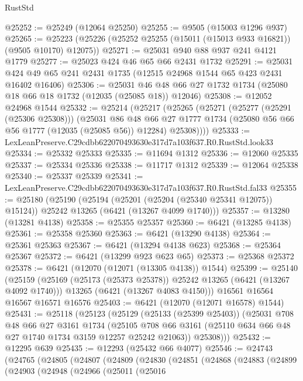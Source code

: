\begin{lexlean}{RustStd}
\begin{coremodule}
@25252 := @25249 (@12064 @25250)
@25255 := @9505 (@15003 @1296 @937)
@25265 := @25223 (@25226 (@25252 @25255 (@15011 (@15013 @933 @16821)) (@9505 @10170) @12075))
@25271 := @25031 @940 @88 @937 @241 @4121 @1779
@25277 := @25023 @424 @46 @65 @66 @2431 @1732
@25291 := @25031 @424 @49 @65 @241 @2431 @1735 (@12515 @24968 @1544 @65 @423 @2431 @16402 @16406)
@25306 := @25031 @46 @48 @66 @27 @1732 @1734 (@25080 @18 @66 @18 @1732 (@12035 (@25085 @18)) @12046)
@25308 := @12052 @24968 @1544
@25332 := @25214
    (@25217
      (@25265
        (@25271
          (@25277 (@25291 (@25306 @25308)))
          (@25031
            @86
            @48
            @66
            @27
            @1777
            @1734
            (@25080 @56 @66 @56 @1777 (@12035 (@25085 @56)) @12284)
            @25308))))
@25333 := LexLeanPreserve.C29cdbb622070493630e317d7a103f637.R0.RustStd.look33
@25334 := @25332 @25333
@25335 := @11694 @1312
@25336 := @12060 @25335
@25337 := @25334 @25336
@25338 := @11717 @1312
@25339 := @12064 @25338
@25340 := @25337 @25339
@25341 := LexLeanPreserve.C29cdbb622070493630e317d7a103f637.R0.RustStd.fal33
@25355 := @25180
    (@25190
      (@25194 (@25201 (@25204 (@25340 @25341 @12075)) @15124))
      @25242
      @13265
      (@6421 (@13267 @4099 @1740)))
@25357 := @13280 (@13281 @4138)
@25358 := @25355 @25357
@25360 := @6421 (@13285 @4138)
@25361 := @25358 @25360
@25363 := @6421 (@13290 @4138)
@25364 := @25361 @25363
@25367 := @6421 (@13294 @4138 @623)
@25368 := @25364 @25367
@25372 := @6421 (@13299 @923 @623 @65)
@25373 := @25368 @25372
@25378 := @6421 (@12070 (@12071 (@13305 @4138)) @1544)
@25399 := @25140
    (@25159
      (@25169 (@25173 (@25373 @25378)) @25242 @13265 (@6421 (@13267 @4092 @1740)))
      @13265
      (@6421 (@13267 @4083 @4150)))
    @16561
    @16564
    @16567
    @16571
    @16576
@25403 := @6421 (@12070 (@12071 @16578) @1544)
@25431 := @25118
    (@25123
      (@25129
        (@25133 (@25399 @25403))
        (@25031
          @708
          @48
          @66
          @27
          @3161
          @1734
          (@25105 @708 @66 @3161 (@25110 @634 @66 @48 @27 @1740 @1734 @3159 @12257 @25242 @21063))
          @25308)))
@25432 := @12295 @639
@25435 := @12293 (@25432 @66 @4077)
@25546 := @24743
    (@24765
      (@24805
        (@24807
          (@24809
            (@24830
              (@24851
                (@24868
                  (@24883
                    (@24899
                      (@24903
                        (@24948
                          (@24966
                            (@25011
                              (@25016

\end{coremodule}
\end{lexlean}
